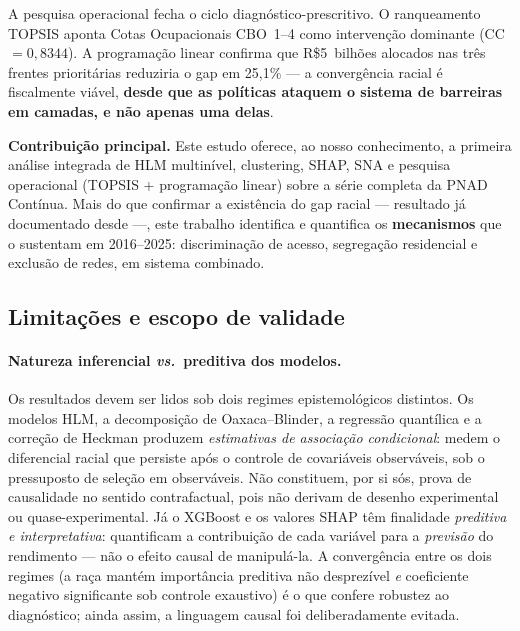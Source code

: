 \documentclass[12pt, a4paper, oneside]{article}
\begin{document}
A pesquisa operacional fecha o ciclo diagnóstico-prescritivo.
O ranqueamento TOPSIS aponta Cotas Ocupacionais CBO~1--4 como
intervenção dominante (CC~$=0,8344$).
A programação linear confirma que R\$5~bilhões alocados nas três
frentes prioritárias reduziria o gap em 25,1\%
--- a convergência racial é fiscalmente viável, \textbf{desde que as
políticas ataquem o sistema de barreiras em camadas, e não apenas uma delas}.

\bigskip

\noindent\textbf{Contribuição principal.}
Este estudo oferece, ao nosso conhecimento, a primeira análise integrada
de HLM multinível, clustering, SHAP, SNA e pesquisa operacional
(TOPSIS + programação linear) sobre a série completa da PNAD Contínua.
Mais do que confirmar a existência do gap racial --- resultado já documentado
desde  ---, este trabalho identifica e quantifica os
\textbf{mecanismos} que o sustentam em 2016--2025: discriminação de acesso,
segregação residencial e exclusão de redes, em sistema combinado.

\bigskip

\subsection*{Limitações e escopo de validade}

\paragraph{Natureza inferencial \textit{vs.}\ preditiva dos modelos.}
Os resultados devem ser lidos sob dois regimes epistemológicos distintos.
Os modelos HLM, a decomposição de Oaxaca--Blinder, a regressão quantílica e
a correção de Heckman produzem \textit{estimativas de associação condicional}:
medem o diferencial racial que persiste após o controle de covariáveis
observáveis, sob o pressuposto de seleção em observáveis. Não constituem, por
si sós, prova de causalidade no sentido contrafactual, pois não derivam de
desenho experimental ou quase-experimental. Já o XGBoost e os valores SHAP têm
finalidade \textit{preditiva e interpretativa}: quantificam a contribuição de
cada variável para a \textit{previsão} do rendimento --- não o efeito causal
de manipulá-la. A convergência entre os dois regimes (a raça mantém importância
preditiva não desprezível \textit{e} coeficiente negativo significante sob
controle exaustivo) é o que confere robustez ao diagnóstico; ainda assim, a
linguagem causal foi deliberadamente evitada.
\end{document}

